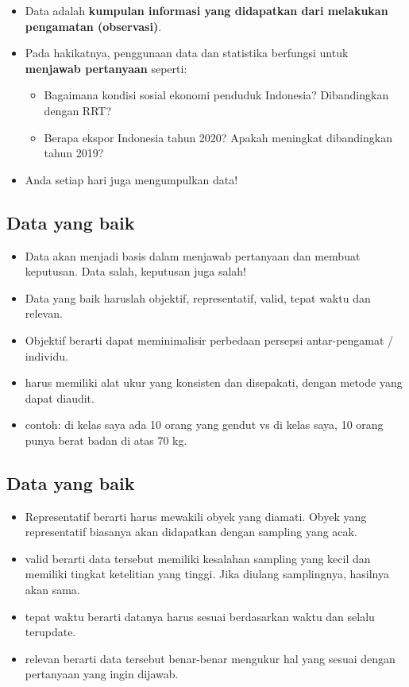 \documentclass[
  letterpaper,
  DIV=11,
  numbers=noendperiod]{scrartcl}
\begin{document}
\begin{itemize}
\item
  Data adalah \textbf{kumpulan informasi yang didapatkan dari melakukan
  pengamatan (observasi)}.
\item
  Pada hakikatnya, penggunaan data dan statistika berfungsi untuk
  \textbf{menjawab pertanyaan} seperti:

  \begin{itemize}
  \item
    Bagaimana kondisi sosial ekonomi penduduk Indonesia? Dibandingkan
    dengan RRT?
  \item
    Berapa ekspor Indonesia tahun 2020? Apakah meningkat dibandingkan
    tahun 2019?
  \end{itemize}
\item
  Anda setiap hari juga mengumpulkan data!
\end{itemize}

\subsection{Data yang baik}\label{data-yang-baik}

\begin{itemize}
\item
  Data akan menjadi basis dalam menjawab pertanyaan dan membuat
  keputusan. Data salah, keputusan juga salah!
\item
  Data yang baik haruslah objektif, representatif, valid, tepat waktu
  dan relevan.
\item
  Objektif berarti dapat meminimalisir perbedaan persepsi antar-pengamat
  / individu.
\item
  harus memiliki alat ukur yang konsisten dan disepakati, dengan metode
  yang dapat diaudit.
\item
  contoh: di kelas saya ada 10 orang yang gendut vs di kelas saya, 10
  orang punya berat badan di atas 70 kg.
\end{itemize}

\subsection{Data yang baik}\label{data-yang-baik-1}

\begin{itemize}
\item
  Representatif berarti harus mewakili obyek yang diamati. Obyek yang
  representatif biasanya akan didapatkan dengan sampling yang acak.
\item
  valid berarti data tersebut memiliki kesalahan sampling yang kecil dan
  memiliki tingkat ketelitian yang tinggi. Jika diulang samplingnya,
  hasilnya akan sama.
\item
  tepat waktu berarti datanya harus sesuai berdasarkan waktu dan selalu
  terupdate.
\item
  relevan berarti data tersebut benar-benar mengukur hal yang sesuai
  dengan pertanyaan yang ingin dijawab.
\end{itemize}
\end{document}
